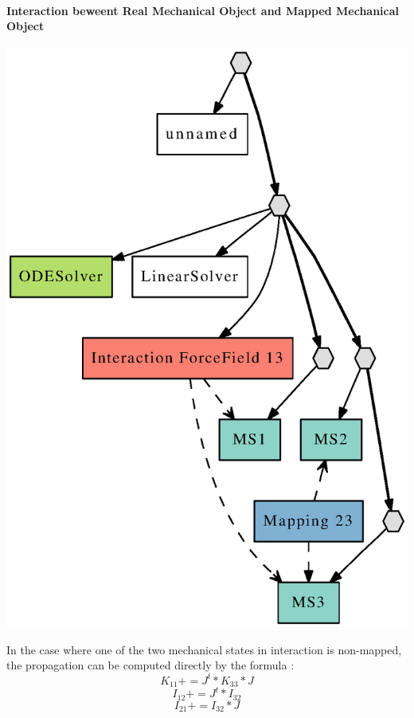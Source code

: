 \documentclass[a4paper,10pt]{article}
\begin{document}
\paragraph{Interaction beweent Real Mechanical Object and Mapped Mechanical Object}
\begin{center}
  \includegraphics[scale=0.3]{interaction_Real_Mapped}
\end{center}
In the case where one of the two mechanical states in interaction is non-mapped, the propagation can be computed directly by the formula :
\[
K_{11} += J^t * K_{33} * J 
\]
\[
I_{12} += J^t * I_{32}
\]
\[
I_{21} += I_{32} * J 
\]
\end{document}

